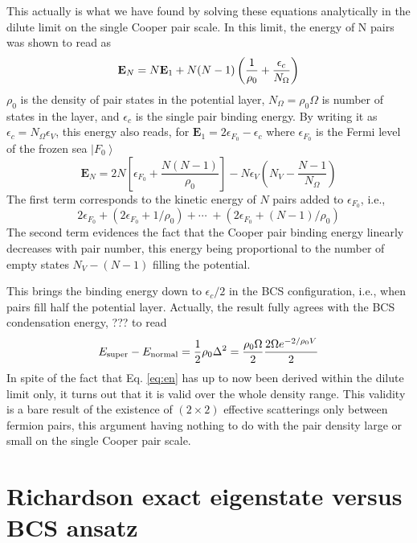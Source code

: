 \documentclass[aps,prb,superscriptaddress,twocolumn]{revtex4}
\begin{document}
This actually is what we have found by solving these equations analytically
in the dilute limit on the single Cooper pair scale. In this limit, the
energy of N pairs was shown to read as 
\begin{equation}  \label{eq:en}
\mathbf{E} _N=N\mathbf{E} _1+N(N-1)\left(\frac{1}{\rho_0} +\frac{\epsilon_c}{%
N_\Omega}\right) 
\end{equation}
$\rho_0$ is the density of pair states in the potential layer, $%
N_\Omega=\rho_0\Omega$ is number of states in the layer, and $\epsilon_c$ is
the single pair binding energy. By writing it as $\epsilon_c=N_\Omega%
\epsilon_V$, this energy also reads, for $\mathbf{E} _1=2\epsilon_{F_0}-%
\epsilon_c$ where $\epsilon_{F_0}$ is the Fermi level of the frozen sea $%
\left|F_0\right> $ 
\begin{equation}
\mathbf{E} _N=2N\left[\epsilon_{F_0}+\frac{N(N-1)}{\rho_0}\right]
-N\epsilon_V\left(N_V-\frac{N-1}{N_\Omega}\right) 
\end{equation}
The first term corresponds to the kinetic energy of $N$ pairs added to $%
\epsilon_{F_0}$, i.e., 
\begin{equation}
2\epsilon_{F_0}+\left(2\epsilon_{F_0}+1/\rho_0\right)
+\cdots\;+\left(2\epsilon_{F_0}+(N-1)/\rho_0\right) 
\end{equation}
The second term evidences the fact that the Cooper pair binding energy
linearly decreases with pair number, this energy being proportional to the
number of empty states $N_V-(N-1)$ filling the potential.

This brings the binding energy down to $\epsilon_c/2$ in the BCS
configuration, i.e., when pairs fill half the potential layer. Actually, the
result fully agrees with the BCS condensation energy, ??? to read 
\begin{equation}
E_{\text{super}}-E_\text{normal}=\frac{1}{2} \rho_0\Delta^2=\frac{%
\rho_0\Omega}{2}\frac{2\Omega{e^{-2/\rho_0V}}}{2}
\end{equation}
In spite of the fact that Eq. \eqref{eq:en} has up to now been derived
within the dilute limit only, it turns out that it is valid over the whole
density range. This validity is a bare result of the existence of $(2\times2)
$ effective scatterings only between fermion pairs, this argument having
nothing to do with the pair density large or small on the single Cooper pair
scale.

\section{Richardson exact eigenstate versus BCS ansatz \label{sec:conn}}
\end{document}
